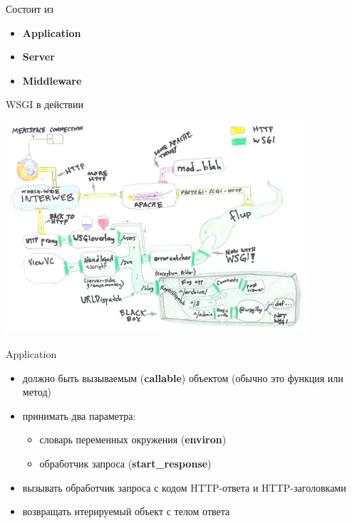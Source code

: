 \begin{frame}{Состоит из}

    \begin{itemize}
        \item \textbf{Application}
        \item \textbf{Server}
        \item \textbf{Middleware}
    \end{itemize}

\end{frame}

\begin{frame}{WSGI в действии}

    \begin{center}
        \vspace{-0.35in}\includegraphics[width=4.4in]{media/wsgi_ianb.png}
    \end{center}

\end{frame}

\begin{frame}{Application}

    \begin{itemize}
        \item должно быть вызываемым (\textbf{callable}) объектом (обычно это
            функция или метод)
        \item принимать два параметра:
            \begin{itemize}
                \item словарь переменных окружения (\textbf{environ})
                \item обработчик запроса (\textbf{start\_response})
            \end{itemize}
        \item вызывать обработчик запроса с кодом HTTP-ответа и
            HTTP-заголовками
        \item возвращать итерируемый объект с телом ответа
    \end{itemize}

\end{frame}

